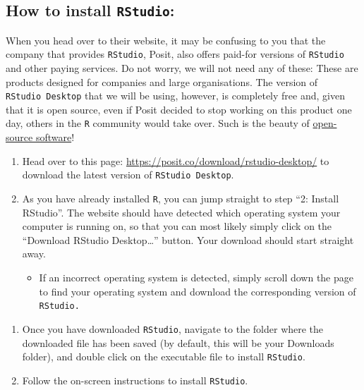 \documentclass[
  letterpaper,
  DIV=11,
  numbers=noendperiod,
  oneside]{scrreprt}
\providecommand{\tightlist}{%
  \setlength{\itemsep}{0pt}\setlength{\parskip}{0pt}}\usepackage{longtable,booktabs,array}
\begin{document}
\subsection{\texorpdfstring{How to install
\texttt{RStudio}:}{How to install RStudio:}}\label{how-to-install-rstudio}

When you head over to their website, it may be confusing to you that the
company that provides \texttt{RStudio}, Posit, also offers paid-for
versions of \texttt{RStudio} and other paying services. Do not worry, we
will not need any of these: These are products designed for companies
and large organisations. The version of \texttt{RStudio\ Desktop} that
we will be using, however, is completely free and, given that it is open
source, even if Posit decided to stop working on this product one day,
others in the \texttt{R} community would take over. Such is the beauty
of
\href{https://elenlefoll.github.io/RstatsTextbook/OpenScholarship.html}{open-source
software}! 🤗

\begin{enumerate}
\def\labelenumi{\arabic{enumi}.}
\item
  Head over to this page:
  \url{https://posit.co/download/rstudio-desktop/} to download the
  latest version of \texttt{RStudio\ Desktop}.
\item
  As you have already installed \texttt{R}, you can jump straight to
  step ``2: Install RStudio''. The website should have detected which
  operating system your computer is running on, so that you can most
  likely simply click on the ``Download RStudio Desktop\ldots{}''
  button. Your download should start straight away.

  \begin{itemize}
  \tightlist
  \item
    If an incorrect operating system is detected, simply scroll down the
    page to find your operating system and download the corresponding
    version of \texttt{RStudio.}
  \end{itemize}
\end{enumerate}

\begin{enumerate}
\def\labelenumi{\arabic{enumi}.}
\setcounter{enumi}{2}
\item
  Once you have downloaded \texttt{RStudio}, navigate to the folder
  where the downloaded file has been saved (by default, this will be
  your Downloads folder), and double click on the executable file to
  install \texttt{RStudio}.
\item
  Follow the on-screen instructions to install \texttt{RStudio}.
\end{enumerate}
\end{document}
